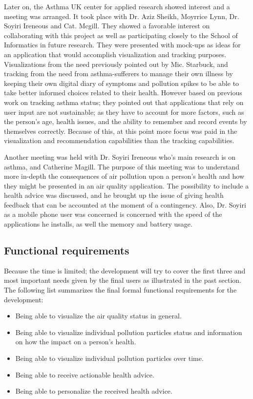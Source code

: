 Later on, the Asthma UK center for applied research showed interest and a meeting was arranged. It took place with Dr. Aziz Sheikh, Moyrrice Lynn, Dr. Soyiri Ireneous and Cat. Mcgill. They showed a favorable interest on collaborating with this project as well as participating closely to the School of Informatics in future research. They were presented with mock-ups as ideas for an application that would accomplish visualization and tracking purposes. Visualizations from the need previously pointed out by Mic. Starbuck, and tracking from the need from asthma-sufferers to manage their own illness by keeping their own digital diary of symptoms and pollution spikes to be able to take better informed choices related to their health. However based on previous work on tracking asthma status; they pointed out that applications that rely on user input are not sustainable; as they have to account for more factors, such as the person's age, health issues, and the ability to remember and record events by themselves correctly. Because of this, at this point more focus was paid in the visualization and recommendation capabilities than the tracking capabilities. 

Another meeting was held with Dr. Soyiri Ireneous who's main research is on asthma, and Catherine Magill. The purpose of this meeting was to understand more in-depth the consequences of air pollution upon a person's health and how they might be presented in an air quality application. The possibility to include a health advice was discussed, and he brought up the issue of giving health feedback that can be accounted at the moment of a contingency. Also, Dr. Soyiri as a mobile phone user was concerned is concerned with the speed of the applications he installs, as well the memory and battery usage.


\subsection{Functional requirements}

Because the time is limited; the development will try to cover the first three and most important needs given by the final users as illustrated in the past section. The following list summarizes the final formal functional requirements for the development:

\begin{itemize}
	\item Being able to visualize the air quality status in general.
	\item Being able to visualize individual pollution particles status and information on how the impact on a person's health.
	\item Being able to visualize individual pollution particles over time.
    \item Being able to receive actionable health advice.
    \item Being able to personalize the received health advice.
\end{itemize}


